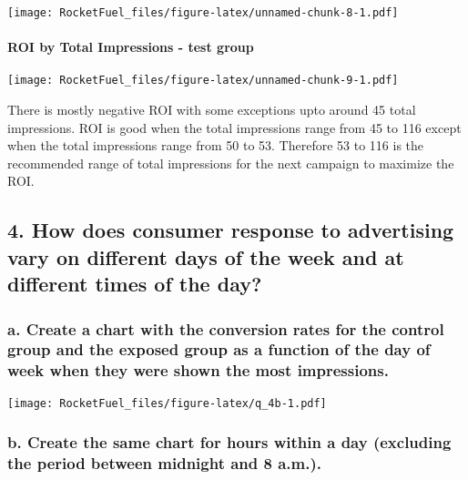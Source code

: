 \documentclass[
]{article}
\begin{document}
\texttt{[image: RocketFuel\_files/figure-latex/unnamed-chunk-8-1.pdf]}

\hypertarget{roi-by-total-impressions---test-group}{%
\paragraph{ROI by Total Impressions - test
group}\label{roi-by-total-impressions---test-group}}

\texttt{[image: RocketFuel\_files/figure-latex/unnamed-chunk-9-1.pdf]}

There is mostly negative ROI with some exceptions upto around 45 total
impressions. ROI is good when the total impressions range from 45 to 116
except when the total impressions range from 50 to 53. Therefore 53 to
116 is the recommended range of total impressions for the next campaign
to maximize the ROI.

\hypertarget{how-does-consumer-response-to-advertising-vary-on-different-days-of-the-week-and-at-different-times-of-the-day}{%
\subsection{4. How does consumer response to advertising vary on
different days of the week and at different times of the
day?}\label{how-does-consumer-response-to-advertising-vary-on-different-days-of-the-week-and-at-different-times-of-the-day}}

\hypertarget{a.-create-a-chart-with-the-conversion-rates-for-the-control-group-and-the-exposed-group-as-a-function-of-the-day-of-week-when-they-were-shown-the-most-impressions.}{%
\subsubsection{a. Create a chart with the conversion rates for the
control group and the exposed group as a function of the day of week
when they were shown the most
impressions.}\label{a.-create-a-chart-with-the-conversion-rates-for-the-control-group-and-the-exposed-group-as-a-function-of-the-day-of-week-when-they-were-shown-the-most-impressions.}}

\texttt{[image: RocketFuel\_files/figure-latex/q\_4b-1.pdf]}

\hypertarget{b.-create-the-same-chart-for-hours-within-a-day-excluding-the-period-between-midnight-and-8-a.m..}{%
\subsubsection{b. Create the same chart for hours within a day
(excluding the period between midnight and 8
a.m.).}\label{b.-create-the-same-chart-for-hours-within-a-day-excluding-the-period-between-midnight-and-8-a.m..}}
\end{document}
